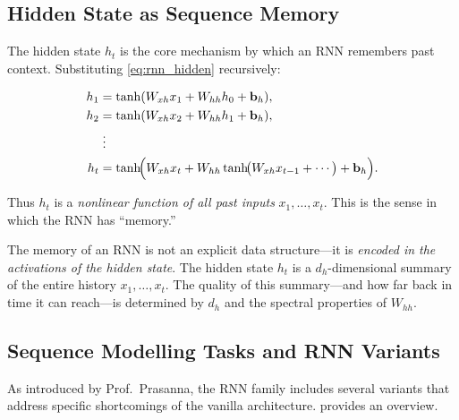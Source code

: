 \documentclass[12pt,a4paper]{article}
\newcommand{\Whh}{W_{hh}}
\newcommand{\Wxh}{W_{xh}}
\begin{document}
\subsection{Hidden State as Sequence Memory}
\label{subsec:hidden_state_memory}

The hidden state $h_t$ is the core mechanism by which an RNN remembers
past context.  Substituting \cref{eq:rnn_hidden} recursively:

\begin{align}
  h_1 &= \tanh(\Wxh x_1 + \Whh h_0 + \mathbf{b}_h), \\
  h_2 &= \tanh(\Wxh x_2 + \Whh h_1 + \mathbf{b}_h), \\
      &\;\vdots \notag \\
  h_t &= \tanh\!\Bigl(\Wxh x_t + \Whh \tanh\!\bigl(\Wxh x_{t-1} + \cdots
         \bigr) + \mathbf{b}_h\Bigr).
\end{align}

Thus $h_t$ is a \emph{nonlinear function of all past inputs}
$x_1, \ldots, x_t$.  This is the sense in which the RNN has ``memory.''

\begin{keyinsight}
The memory of an RNN is not an explicit data structure---it is \emph{encoded
in the activations of the hidden state}.  The hidden state $h_t$ is a
$d_h$-dimensional summary of the entire history $x_1, \ldots, x_t$.  The
quality of this summary---and how far back in time it can reach---is
determined by $d_h$ and the spectral properties of $\Whh$.
\end{keyinsight}

\subsection{Sequence Modelling Tasks and RNN Variants}
\label{subsec:rnn_variants}

As introduced by Prof.\ Prasanna, the RNN family includes several variants
that address specific shortcomings of the vanilla architecture.
 provides an overview.
\end{document}

